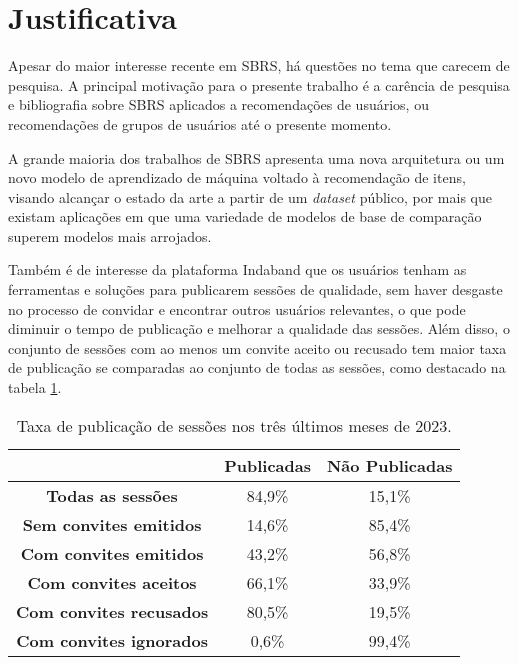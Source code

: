 \section{Justificativa}

Apesar do maior interesse recente em SBRS, há questões no tema que carecem de
 pesquisa. A principal motivação para o presente trabalho é a carência de
 pesquisa e bibliografia sobre SBRS aplicados a recomendações de usuários, ou
 recomendações de grupos de usuários até o presente momento.
 
 A grande maioria dos trabalhos de SBRS apresenta uma nova arquitetura ou um
 novo modelo de aprendizado de máquina voltado à recomendação de itens, visando
 alcançar o estado da arte a partir de um \textit{dataset} público, por mais que
 existam aplicações em que uma variedade de modelos de base de comparação
 superem modelos mais arrojados.
 
 Também é de interesse da plataforma Indaband que os usuários tenham as
 ferramentas e soluções para publicarem sessões de qualidade, sem haver desgaste
 no processo de convidar e encontrar outros usuários relevantes, o que pode
 diminuir o tempo de publicação e melhorar a qualidade das sessões. Além disso,
 o conjunto de sessões com ao menos um convite aceito ou recusado tem maior taxa
 de publicação se comparadas ao conjunto de todas as sessões, como destacado na
 tabela \ref{tab:publicacao_sessoes}.

\begin{table}[htbp]
    \centering
    \begin{tabular}{|c|c|c|}
        \hline
        & \textbf{Publicadas} & \textbf{Não Publicadas} \\
        \hline
        \textbf{Todas as sessões} & 84,9\% & 15,1\% \\ 
        \hline
        \textbf{Sem convites emitidos} & 14,6\% & 85,4\% \\
        \hline
        \textbf{Com convites emitidos} & 43,2\% & 56,8\% \\ 
        \hline
        \textbf{Com convites aceitos} & 66,1\% & 33,9\% \\
        \hline
        \textbf{Com convites recusados} & 80,5\% & 19,5\% \\
        \hline
        \textbf{Com convites ignorados} & 0,6\% & 99,4\% \\
        \hline
    \end{tabular}
    \caption{Taxa de publicação de sessões nos três últimos meses de 2023.}
    \label{tab:publicacao_sessoes}
\end{table}



